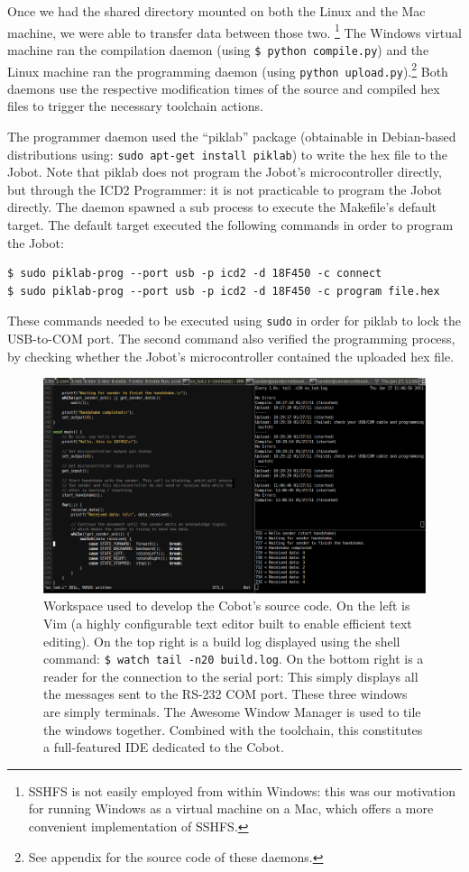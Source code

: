 \documentclass[a4paper,10pt]{article} %
\begin{document}
Once we had the shared directory mounted on both the Linux and the Mac machine,
we were able to transfer data between those two.  \footnote{SSHFS is not easily
employed from within Windows: this was our motivation for running Windows as a
virtual machine on a Mac, which offers a more convenient implementation of
SSHFS.} The Windows virtual machine ran the compilation daemon (using \texttt{\$
python compile.py}) and the Linux machine ran the programming daemon (using
\texttt{python upload.py}).\footnote{See appendix for the source code of these
daemons.} Both daemons use the respective modification times of the source and
compiled hex files to trigger the necessary toolchain actions.

The programmer daemon used the ``piklab'' package (obtainable in Debian-based
distributions using: \texttt{sudo apt-get install piklab}) to write the hex file
to the Jobot. Note that piklab does not program the Jobot's microcontroller
directly, but through the ICD2 Programmer: it is not practicable to program the
Jobot directly. The daemon spawned a sub process to execute the Makefile's
default target. The default target executed the following commands in order to
program the Jobot:

\begin{verbatim}
$ sudo piklab-prog --port usb -p icd2 -d 18F450 -c connect
$ sudo piklab-prog --port usb -p icd2 -d 18F450 -c program file.hex
\end{verbatim}

These commands needed to be executed using \texttt{sudo} in order for piklab to
lock the USB-to-COM port. The second command also verified the programming
process, by checking whether the Jobot's microcontroller contained the uploaded
hex file.

\begin{figure}[H]
\hspace{-1.2in}
\includegraphics[scale=0.5]{img/workspace}
\caption{Workspace used to develop the Cobot's source code. On the left is Vim
(a highly configurable text editor built to enable efficient text editing). On
the top right is a build log displayed using the shell command: \texttt{\$
watch tail -n20 build.log}. On the bottom right is a reader for the
connection to the serial port: This simply displays all the messages sent to
the RS-232 COM port. These three windows are simply terminals. The Awesome
Window Manager is used to tile the windows together. Combined with the
toolchain, this constitutes a full-featured IDE dedicated to the Cobot.}
\end{figure}
\end{document}
